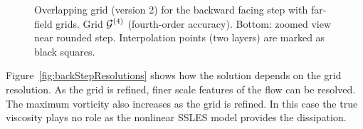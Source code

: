 \documentclass[11pt]{article}
\begin{document}
{
\begin{figure}[hbt]
\newcommand{\figWidth}{16cm}
\newcommand{\trimfig}[2]{\trimFigb{#1}{#2}{0.01}{.01}{.275}{.275}}
\newcommand{\figWidtha}{5.5cm}
\newcommand{\trimfiga}[2]{\trimFigb{#1}{#2}{0.0}{.0}{.0}{.0}}
\begin{center}\small
\caption{
Overlapping grid (version 2) for the backward facing step with far-field grids. Grid ${\mathcal G}^{(4)}$ (fourth-order accuracy). Bottom: zoomed view near rounded step.
Interpolation points (two layers) are marked as black squares.
}
\label{fig:backStepRefineGrids}
\end{center}
\end{figure}
}

Figure~\ref{fig:backStepResolutions} shows how the solution depends on the grid resolution.
As the grid is refined, finer scale features of the flow can be resolved.
The maximum vorticity also increases as the grid is refined. 
In this case the true viscosity plays no role as the nonlinear SSLES model provides the dissipation.
\end{document}
